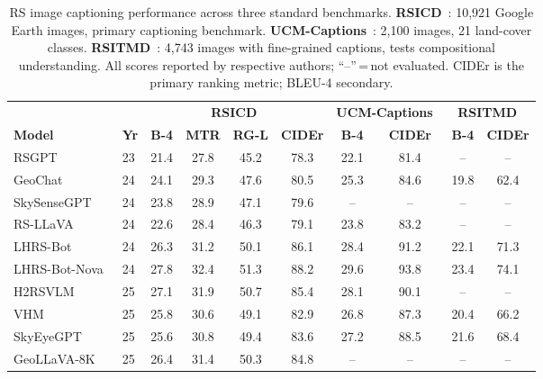 \begin{table}[t]
\caption{RS image captioning performance across three standard benchmarks.
\textbf{RSICD}~\cite{rsicd2017}: 10,921 Google Earth images, primary captioning benchmark.
\textbf{UCM-Captions}~\cite{ucmcaptions2016}: 2,100 images, 21 land-cover classes.
\textbf{RSITMD}~\cite{rsitmd2022}: 4,743 images with fine-grained captions, tests compositional understanding.
All scores reported by respective authors; ``--''\,=\,not evaluated.
CIDEr is the primary ranking metric; BLEU-4 secondary.}\label{tab:captioning}
\footnotesize\setlength\tabcolsep{2.5pt}
\begin{tabular*}{\textwidth}{@{\extracolsep\fill}lp{0.28cm}cccc cc cc}
\toprule
 & & \multicolumn{4}{c}{\textbf{RSICD}~\cite{rsicd2017}} &
\multicolumn{2}{c}{\textbf{UCM-Captions}~\cite{ucmcaptions2016}} &
\multicolumn{2}{c}{\textbf{RSITMD}~\cite{rsitmd2022}} \\
\cmidrule(lr){3-6}\cmidrule(lr){7-8}\cmidrule(lr){9-10}
\textbf{Model} & \textbf{Yr} &
\textbf{B-4} & \textbf{MTR} & \textbf{RG-L} & \textbf{CIDEr} &
\textbf{B-4} & \textbf{CIDEr} &
\textbf{B-4} & \textbf{CIDEr} \\
\midrule
RSGPT~\cite{rsgpt2023}                    & 23 & 21.4 & 27.8 & 45.2 & 78.3 & 22.1 & 81.4 & -- & -- \\
GeoChat~\cite{geochat2024}                & 24 & 24.1 & 29.3 & 47.6 & 80.5 & 25.3 & 84.6 & 19.8 & 62.4 \\
SkySenseGPT~\cite{skysensegpt2024}        & 24 & 23.8 & 28.9 & 47.1 & 79.6 & -- & -- & -- & -- \\
RS-LLaVA~\cite{rsllava2024}               & 24 & 22.6 & 28.4 & 46.3 & 79.1 & 23.8 & 83.2 & -- & -- \\
LHRS-Bot~\cite{lhrsbot2024}               & 24 & 26.3 & 31.2 & 50.1 & 86.1 & 28.4 & 91.2 & 22.1 & 71.3 \\
LHRS-Bot-Nova~\cite{lhrsbotnova2024}      & 24 & 27.8 & 32.4 & 51.3 & 88.2 & 29.6 & 93.8 & 23.4 & 74.1 \\
H2RSVLM~\cite{h2rsvlm2025}               & 25 & 27.1 & 31.9 & 50.7 & 85.4 & 28.1 & 90.1 & -- & -- \\
VHM~\cite{vhm2025}                        & 25 & 25.8 & 30.6 & 49.1 & 82.9 & 26.8 & 87.3 & 20.4 & 66.2 \\
SkyEyeGPT~\cite{skyeyegpt2025}            & 25 & 25.6 & 30.8 & 49.4 & 83.6 & 27.2 & 88.5 & 21.6 & 68.4 \\
GeoLLaVA-8K~\cite{geollava2025}           & 25 & 26.4 & 31.4 & 50.3 & 84.8 & -- & -- & -- & -- \\

\end{tabular*}
\end{table}
